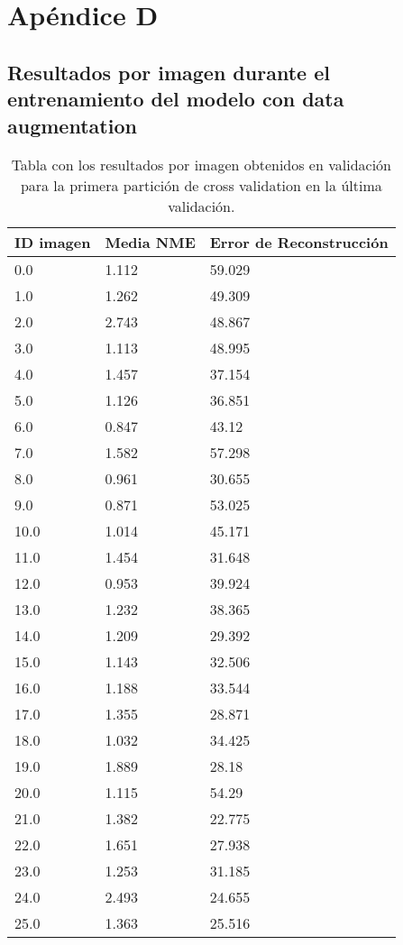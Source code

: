 
\chapter{Apéndice D}\label{ap:apendiceD}

\section{Resultados por imagen durante el entrenamiento del modelo con data augmentation}

\begin{table}[!ht]
    \centering
    \caption{Tabla con los resultados por imagen obtenidos en validación para la primera partición de cross validation en la última validación.}
    \begin{tabular}{|l|l|l|}
    \hline
        ID imagen & Media NME & Error de Reconstrucción \\ \hline
        0.0 & 1.112 & 59.029 \\ \hline
        1.0 & 1.262 & 49.309 \\ \hline
        2.0 & 2.743 & 48.867 \\ \hline
        3.0 & 1.113 & 48.995 \\ \hline
        4.0 & 1.457 & 37.154 \\ \hline
        5.0 & 1.126 & 36.851 \\ \hline
        6.0 & 0.847 & 43.12 \\ \hline
        7.0 & 1.582 & 57.298 \\ \hline
        8.0 & 0.961 & 30.655 \\ \hline
        9.0 & 0.871 & 53.025 \\ \hline
        10.0 & 1.014 & 45.171 \\ \hline
        11.0 & 1.454 & 31.648 \\ \hline
        12.0 & 0.953 & 39.924 \\ \hline
        13.0 & 1.232 & 38.365 \\ \hline
        14.0 & 1.209 & 29.392 \\ \hline
        15.0 & 1.143 & 32.506 \\ \hline
        16.0 & 1.188 & 33.544 \\ \hline
        17.0 & 1.355 & 28.871 \\ \hline
        18.0 & 1.032 & 34.425 \\ \hline
        19.0 & 1.889 & 28.18 \\ \hline
        20.0 & 1.115 & 54.29 \\ \hline
        21.0 & 1.382 & 22.775 \\ \hline
        22.0 & 1.651 & 27.938 \\ \hline
        23.0 & 1.253 & 31.185 \\ \hline
        24.0 & 2.493 & 24.655 \\ \hline
        25.0 & 1.363 & 25.516 \\ \hline
    \end{tabular}
    \label{table:Daugmentation_images_1}
\end{table}


